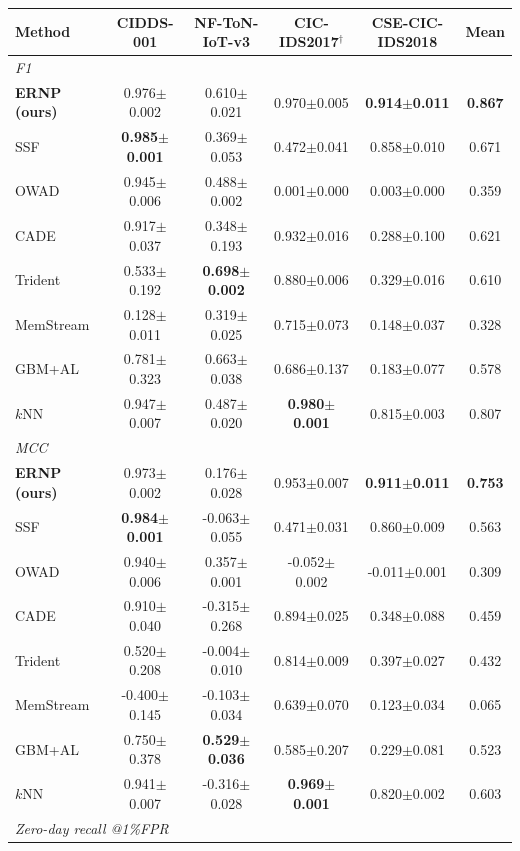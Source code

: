\begin{tabular}{lccccc}
\toprule
Method & CIDDS-001 & NF-ToN-IoT-v3 & CIC-IDS2017$^\dagger$ & CSE-CIC-IDS2018 & Mean\\
\midrule
\multicolumn{6}{l}{\emph{F1}}\\
\textbf{ERNP (ours)} & 0.976$\pm$0.002 & 0.610$\pm$0.021 & 0.970$\pm$0.005 & \textbf{0.914$\pm$0.011} & \textbf{0.867}\\
SSF & \textbf{0.985$\pm$0.001} & 0.369$\pm$0.053 & 0.472$\pm$0.041 & 0.858$\pm$0.010 & 0.671\\
OWAD & 0.945$\pm$0.006 & 0.488$\pm$0.002 & 0.001$\pm$0.000 & 0.003$\pm$0.000 & 0.359\\
CADE & 0.917$\pm$0.037 & 0.348$\pm$0.193 & 0.932$\pm$0.016 & 0.288$\pm$0.100 & 0.621\\
Trident & 0.533$\pm$0.192 & \textbf{0.698$\pm$0.002} & 0.880$\pm$0.006 & 0.329$\pm$0.016 & 0.610\\
MemStream & 0.128$\pm$0.011 & 0.319$\pm$0.025 & 0.715$\pm$0.073 & 0.148$\pm$0.037 & 0.328\\
GBM+AL & 0.781$\pm$0.323 & 0.663$\pm$0.038 & 0.686$\pm$0.137 & 0.183$\pm$0.077 & 0.578\\
$k$NN & 0.947$\pm$0.007 & 0.487$\pm$0.020 & \textbf{0.980$\pm$0.001} & 0.815$\pm$0.003 & 0.807\\
\midrule
\multicolumn{6}{l}{\emph{MCC}}\\
\textbf{ERNP (ours)} & 0.973$\pm$0.002 & 0.176$\pm$0.028 & 0.953$\pm$0.007 & \textbf{0.911$\pm$0.011} & \textbf{0.753}\\
SSF & \textbf{0.984$\pm$0.001} & -0.063$\pm$0.055 & 0.471$\pm$0.031 & 0.860$\pm$0.009 & 0.563\\
OWAD & 0.940$\pm$0.006 & 0.357$\pm$0.001 & -0.052$\pm$0.002 & -0.011$\pm$0.001 & 0.309\\
CADE & 0.910$\pm$0.040 & -0.315$\pm$0.268 & 0.894$\pm$0.025 & 0.348$\pm$0.088 & 0.459\\
Trident & 0.520$\pm$0.208 & -0.004$\pm$0.010 & 0.814$\pm$0.009 & 0.397$\pm$0.027 & 0.432\\
MemStream & -0.400$\pm$0.145 & -0.103$\pm$0.034 & 0.639$\pm$0.070 & 0.123$\pm$0.034 & 0.065\\
GBM+AL & 0.750$\pm$0.378 & \textbf{0.529$\pm$0.036} & 0.585$\pm$0.207 & 0.229$\pm$0.081 & 0.523\\
$k$NN & 0.941$\pm$0.007 & -0.316$\pm$0.028 & \textbf{0.969$\pm$0.001} & 0.820$\pm$0.002 & 0.603\\
\midrule
\multicolumn{6}{l}{\emph{Zero-day recall @1\%FPR}}\\

\end{tabular}
